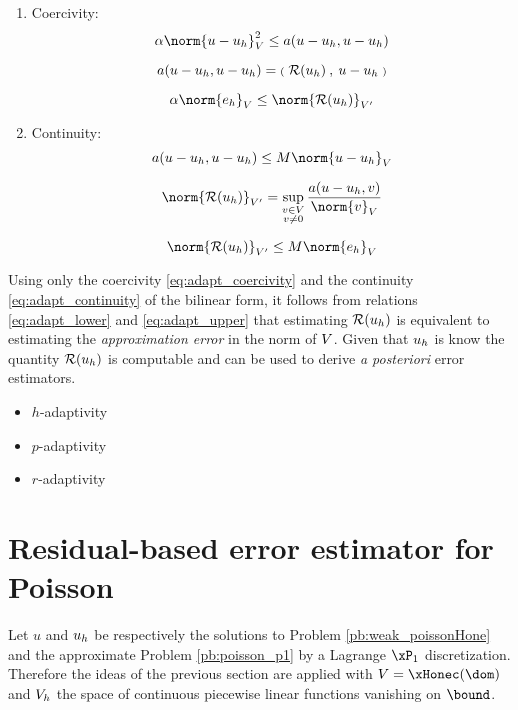 \begin{enumerate}
\item Coercivity:
\begin{equation}\label{eq:adapt_coercivity}
\alpha \norm{u - \uh}_{\xV}^2 \leq a(u - \uh,  u - \uh)
\end{equation}


\[
a(u - {u_h},  u - {u_h}) = {{\scriptstyle\mathbf{(}}\;{\mathcal{R}({u_h})}\:,\: u -{u_h} \;{\scriptstyle\mathbf{)}}}
\]

\begin{equation}\label{eq:adapt_lower}
\alpha \norm{e_h}_{\xV} \leq \norm{\Res{\uh}}_{\xV'}
\end{equation}


\item Continuity:
\begin{equation}\label{eq:adapt_continuity}
a(u - \uh,  u - \uh) \leq M \norm{u - \uh}_{\xV}
\end{equation}


\[
\norm{\Res{\uh}}_{\xV'} = \sup_{\substack{v\in\xV\\v\neq 0}} \dfrac{a(u - \uh, v)}{\norm{v}_\xV}
\]

\begin{equation}\label{eq:adapt_upper}
\norm{\Res{\uh}}_{\xV'} \leq M \norm{e_h}_{\xV}
\end{equation}


\end{enumerate}

Using only the coercivity \eqref{eq:adapt_coercivity} and the continuity \eqref{eq:adapt_continuity} of the bilinear form, it follows from relations \eqref{eq:adapt_lower} and \eqref{eq:adapt_upper} that estimating ${\mathcal{R}({u_h})}$ is equivalent to estimating the \textit{approximation error} in the norm of ${V}$.
Given that ${u_h}$ is know the quantity ${\mathcal{R}({u_h})}$ is computable and can be used to derive \textit{a posteriori} error estimators.



\begin{itemize}
\item $h$-adaptivity
\item $p$-adaptivity
\item $r$-adaptivity
\end{itemize}

\section{Residual-based error estimator for Poisson}

Let $u$ and ${u_h}$ be respectively the solutions to Problem \eqref{pb:weak_poissonHone} and the approximate Problem \eqref{pb:poisson_p1} by a Lagrange $\xPone$ discretization.
Therefore the ideas of the previous section are applied with $\xV = \xHonec(\dom)$ and ${{V}}_h$ the space of continuous piecewise linear functions vanishing on $\bound$.

